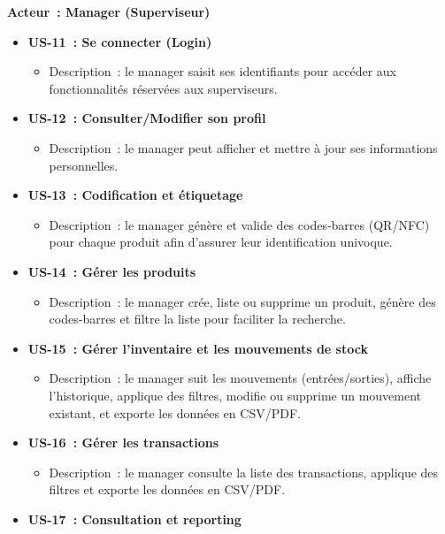\documentclass[12pt,a4paper]{report}
\begin{document}
\medskip
\noindent\textbf{Acteur : Manager (Superviseur)}
\begin{itemize}
  \item \textbf{US-11 : Se connecter (Login)}  
    \begin{itemize}
      \item Description : le manager saisit ses identifiants pour accéder aux fonctionnalités réservées aux superviseurs.
    \end{itemize}
  \item \textbf{US-12 : Consulter/Modifier son profil}  
    \begin{itemize}
      \item Description : le manager peut afficher et mettre à jour ses informations personnelles.
    \end{itemize}
  \item \textbf{US-13 : Codification et étiquetage}  
    \begin{itemize}
      \item Description : le manager génère et valide des codes‑barres (QR/NFC) pour chaque produit afin d’assurer leur identification univoque.
    \end{itemize}
  \item \textbf{US-14 : Gérer les produits}  
    \begin{itemize}
      \item Description : le manager crée, liste ou supprime un produit, génère des codes‑barres et filtre la liste pour faciliter la recherche.
    \end{itemize}
  \item \textbf{US-15 : Gérer l’inventaire et les mouvements de stock}  
    \begin{itemize}
      \item Description : le manager suit les mouvements (entrées/sorties), affiche l’historique, applique des filtres, modifie ou supprime un mouvement existant, et exporte les données en CSV/PDF.
    \end{itemize}
  \item \textbf{US-16 : Gérer les transactions}  
    \begin{itemize}
      \item Description : le manager consulte la liste des transactions, applique des filtres et exporte les données en CSV/PDF.
    \end{itemize}
  \item \textbf{US-17 : Consultation et reporting}  
    \begin{itemize}

\end{itemize}
\end{itemize}
\end{document}
